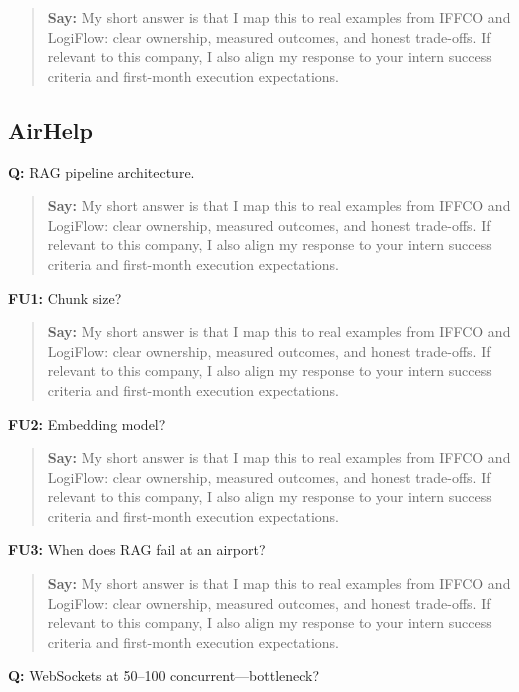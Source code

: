\documentclass[9pt,a4paper]{article}
\begin{document}
\begin{quote}\small\textbf{Say:} My short answer is that I map this to real examples from IFFCO and LogiFlow: clear ownership, measured outcomes, and honest trade-offs. If relevant to this company, I also align my response to your intern success criteria and first-month execution expectations.\end{quote}
\vspace{2mm}
\subsection{AirHelp}
\textbf{Q:} RAG pipeline architecture.

\begin{quote}\small\textbf{Say:} My short answer is that I map this to real examples from IFFCO and LogiFlow: clear ownership, measured outcomes, and honest trade-offs. If relevant to this company, I also align my response to your intern success criteria and first-month execution expectations.\end{quote}
\vspace{2mm}
\textbf{FU1:} Chunk size?

\begin{quote}\small\textbf{Say:} My short answer is that I map this to real examples from IFFCO and LogiFlow: clear ownership, measured outcomes, and honest trade-offs. If relevant to this company, I also align my response to your intern success criteria and first-month execution expectations.\end{quote}
\vspace{2mm}
\textbf{FU2:} Embedding model?

\begin{quote}\small\textbf{Say:} My short answer is that I map this to real examples from IFFCO and LogiFlow: clear ownership, measured outcomes, and honest trade-offs. If relevant to this company, I also align my response to your intern success criteria and first-month execution expectations.\end{quote}
\vspace{2mm}
\textbf{FU3:} When does RAG fail at an airport?

\begin{quote}\small\textbf{Say:} My short answer is that I map this to real examples from IFFCO and LogiFlow: clear ownership, measured outcomes, and honest trade-offs. If relevant to this company, I also align my response to your intern success criteria and first-month execution expectations.\end{quote}
\vspace{2mm}
\textbf{Q:} WebSockets at 50--100 concurrent---bottleneck?
\end{document}
